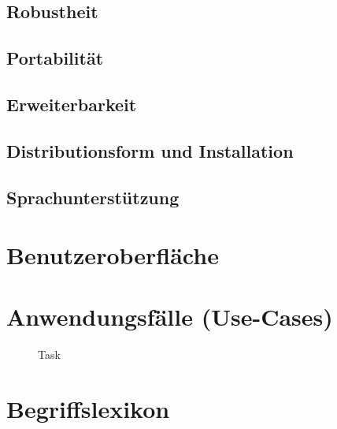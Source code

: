 \documentclass[a4paper,10pt,titlepage]{article}
\newcommand{\usecase}[8]
{\subsection{#1}
\begin{tabular}{|p{0.2\textwidth}|p{0.7\textwidth}|}
\hline
  Akteur & #2\\\hline
  Ziel & #3\\\hline
  Vorbedingung & #4\\\hline
  Normalablauf & #7\\\hline
  Nachbedingung & #5\\\hline
  Sonderfall & #8\\\hline
  Nachbedingung im Sonderfall& #6\\\hline
 \end{tabular}
}
\newcommand{\begriff}[7]
{\subsection{#1}
\begin{tabular}{|p{0.2\textwidth}|p{0.7\textwidth}|}
\hline
  Bedeutung & #2\\\hline
  Abgrenzung & #3\\\hline
  Gültigkeit & #4\\\hline
  Bezeichnung & #5\\\hline
  Unklarheiten & #6\\\hline
  Querverweise & #7\\\hline
 \end{tabular}}
\begin{document}
\subsection{Robustheit}

\subsection{Portabilität}

\subsection{Erweiterbarkeit}

\subsection{Distributionsform und Installation}

\subsection{Sprachunterstützung}

\clearpage
\section{Benutzeroberfläche}


\clearpage
\section{Anwendungsfälle (Use-Cases)}
\begin{figure}[H]
  \centering
  \caption{Task}
\end{figure}



\clearpage
\appendix
\section{Begriffslexikon}

\end{document}
